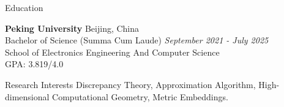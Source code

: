 \documentclass{resume} %
\begin{document}

\begin{rSection}{Education}

{\bf Peking University} \hfill {Beijing, China} 
\\ Bachelor of Science (Summa Cum Laude) \hfill {\em September 2021 - July 2025}
\\ School of Electronics Engineering And Computer Science
\\ GPA: 3.819/4.0



\end{rSection}

\begin{rSection}{Research Interests}{}
Discrepancy Theory, Approximation Algorithm, High-dimensional Computational Geometry, Metric Embeddings.
\end{rSection}
\end{document}
